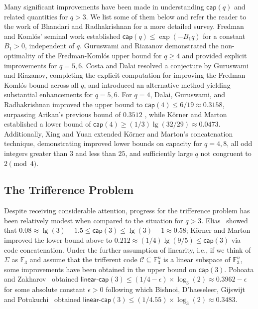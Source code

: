 \documentclass[10pt,a4paper]{article}
\newcommand{\F}{\mathbb{F}}
\newcommand{\calC}{\mathcal{C}}
\newcommand{\bcap}{\mathsf{cap}}
\DeclareMathOperator{\1}{\mathbf{1}}
\begin{document}
Many significant improvements have been made in understanding $\bcap(q)$ and related quantities for $q > 3$.
We list some of them below and refer the reader to the work of Bhandari and Radhakrishnan \cite{BhandariR2022_IEEE_TOIT} for a more detailed survey. 
Fredman and Koml\'{o}s' seminal work \cite{FredmanK1984-perfect} established $\bcap(q) \leq \exp(-B_1q)$ for a constant $B_1>0$, independent of $q$. 
Guruswami and Riazanov \cite{GuruswamiR2019} demonstrated the non-optimality of the Fredman-Komlós upper bound for $q\geq 4$ and provided explicit improvements for $q=5,6$. Costa and Dalai \cite{CostaD2020} resolved a conjecture by Guruswami and Riazanov, completing the explicit computation for improving the Fredman-Koml\'{o}s bound across all $q$, and introduced an alternative method yielding substantial enhancements for $q=5,6$. 
For $q=4$, Dalai, Guruswami, and Radhakrishnan \cite{DalaiGR2020} improved the upper bound to $\bcap(4) \leq 6/19 \approx 0.3158$, surpassing Arikan's previous bound of $0.3512$ \cite{Arikan1994}, while K\"{o}rner and Marton \cite[eq (1.2)]{KornerM1988} established a lower bound of $\bcap(4) \geq (1/3)\lg (32/29)\approx 0.0473$. 
Additionally, Xing and Yuan \cite{XingY2019} extended K\"{o}rner and Marton's concatenation technique, demonstrating improved lower bounds on capacity for $q = 4,8$, all odd integers greater than $3$ and less than $25$, and sufficiently large $q$ not congruent to $2\pmod{4}$.



\subsection*{The Trifference Problem}
Despite receiving considerable attention, progress for the trifference problem has been relatively modest when compared to the situation for $q>3$.
Elias~\cite{Elias1988} showed that $0.08 \approx\lg (3) - 1.5 \leq \bcap(3) \leq \lg(3) -1 \approx 0.58$; 
{K\"{o}rner and Marton~\cite{KornerM1988} improved the lower bound above to $0.212 \approx (1/4)\lg (9/5)\leq \bcap(3)$ via code concatenation.}
Under the further assumption of linearity, i.e., if we think of $\Sigma$ as $\F_3$ and assume that the trifferent code $\calC\subseteq \F_3^n$ is a linear subspace of $\F_3^n$, some improvements have been obtained in the upper bound on $\bcap(3)$. Pohoata and Zakharov~\cite{PohoataZ22} obtained ${\mathsf{linear\text{-}cap}}(3)\leq (1/4-\epsilon)\times \log_3(2) \approx 0.3962 - \epsilon$ for some absolute constant $\epsilon>0$ following which Bishnoi, D'haeseleer, Gijswijt and Potukuchi~\cite{BishnoiDGP23} obtained ${\mathsf{linear\text{-}cap}}(3)\leq  (1/4.55)\times \log_3(2)\approx 0.3483$.
\end{document}

